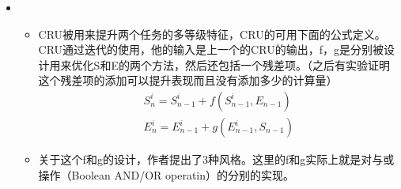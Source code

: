 \begin{itemize}[leftmargin=*]
{\begin{itemize}
		\end{itemize}
	}
	\item
	{\small
		\begin{itemize}
			\item CRU被用来提升两个任务的多等级特征，CRU的可用下面的公式定义。CRU通过迭代的使用，他的输入是上一个的CRU的输出，f，g是分别被设计用来优化S和E的两个方法，然后还包括一个残差项。（之后有实验证明这个残差项的添加可以提升表现而且没有添加多少的计算量）
			\begin{equation}\begin{array}{l}
			S_{n}^{i}=S_{n-1}^{i}+f\left(S_{n-1}^{i}, E_{n-1}\right) \\
			E_{n}^{i}=E_{n-1}^{i}+g\left(E_{n-1}^{i}, S_{n-1}\right)
			\end{array}\end{equation}
			\item 关于这个f和g的设计，作者提出了3种风格。这里的f和g实际上就是对与或操作（Boolean AND/OR operatin）的分别的实现。
			

\end{itemize}}
\end{itemize}
